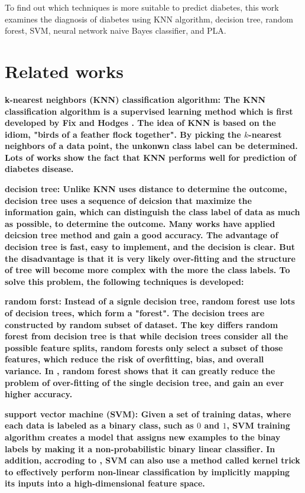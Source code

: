\documentclass[twocolumn,10pt]{article}
\begin{document}
  To find out which techniques is more suitable to predict diabetes, this work examines the diagnosis of diabetes 
  using KNN algorithm, decision tree, random forest, SVM, neural network naive Bayes classifier, and PLA.
\section{Related works}
\label{sec:Related works}
  \bf{k-nearest neighbors (KNN) classification algorithm}: \rm{The} KNN classification algorithm is a supervised learning 
  method which is first developed by Fix and Hodges \cite{10.2307/1403797}. The idea of KNN is based on the idiom, 
  "birds of a feather flock together". By picking the $k$-nearest neighbors of a data point, the unkonwn class label 
  can be determined. Lots of works \cite{6528591} \cite{8276012} \cite{vijayan2014study} show the fact that KNN performs  
  well for prediction of diabetes disease.

  \bf{decision tree}: \rm{Unlike} KNN uses distance to determine the outcome, 
  decision tree uses a sequence of deicsion that maximize the information gain, which can distinguish the class label of 
  data as much as possible, to determine the outcome. Many works \cite{5893838} \cite{8342938} have applied deicsion tree 
  method and gain a good accuracy. The advantage of decision tree is fast, easy to implement, and the decision is clear. 
  But the disadvantage is that it is very likely over-fitting and the structure of tree will become more complex with the 
  more the class labels. To solve this problem, the following techniques is developed:

  \bf{random forst}: \rm{Instead} of a signle decision tree, random forest use lots of decision trees, which form a "forest". 
  The decision trees are constructed by random subset of dataset. The key differs random forest from decision tree is that 
  while decision trees consider all the possible feature splits, random forests only select a subset of those features, which 
  reduce the risk of overfitting, bias, and overall variance. In \cite{7972337} \cite{10.1007/978-981-16-2164-2_19}, random 
  forest shows that it can greatly reduce the problem of over-fitting of the single decision tree, and gain an ever higher accuracy.

  \bf{support vector machine (SVM)}: \rm{Given} a set of training datas, where each data is labeled as a binary class, such as $0$ and $1$, SVM training algorithm creates a model that assigns new examples to the binay labels by making it a non-probabilistic binary linear classifier. In addition, accroding to \cite{amari1999improving} \cite{hofmann2006support}, SVM can also use a method called kernel trick to effectively perform non-linear classification by implicitly mapping its inputs into a high-dimensional feature space.
\end{document}
